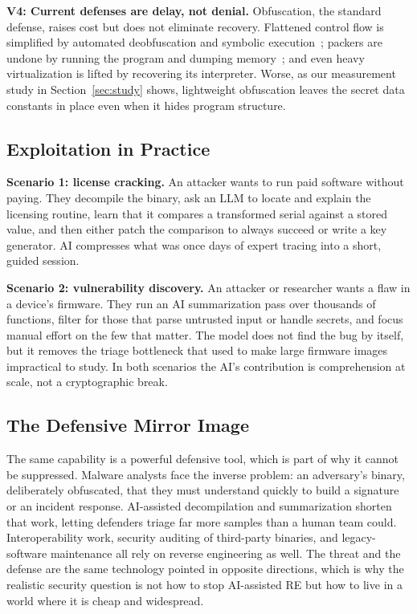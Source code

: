 \documentclass[conference]{IEEEtran}
\begin{document}
\textbf{V4: Current defenses are delay, not denial.} Obfuscation, the standard
defense, raises cost but does not eliminate recovery. Flattened control flow is
simplified by automated deobfuscation and symbolic execution~\cite{angr,udupa};
packers are undone by running the program and dumping memory~\cite{rolles}; and even
heavy virtualization is lifted by recovering its interpreter. Worse, as our
measurement study in Section~\ref{sec:study} shows, lightweight obfuscation leaves
the secret data constants in place even when it hides program structure.

\subsection{Exploitation in Practice}
\textbf{Scenario 1: license cracking.} An attacker wants to run paid software
without paying. They decompile the binary, ask an LLM to locate and explain the
licensing routine, learn that it compares a transformed serial against a stored
value, and then either patch the comparison to always succeed or write a key
generator. AI compresses what was once days of expert tracing into a short,
guided session.

\textbf{Scenario 2: vulnerability discovery.} An attacker or researcher wants a flaw
in a device's firmware. They run an AI summarization pass over thousands of
functions, filter for those that parse untrusted input or handle secrets, and focus
manual effort on the few that matter. The model does not find the bug by itself, but
it removes the triage bottleneck that used to make large firmware images
impractical to study. In both scenarios the AI's contribution is comprehension at
scale, not a cryptographic break.

\subsection{The Defensive Mirror Image}
The same capability is a powerful defensive tool, which is part of why it cannot be
suppressed. Malware analysts face the inverse problem: an adversary's binary,
deliberately obfuscated, that they must understand quickly to build a signature or
an incident response. AI-assisted decompilation and summarization shorten that work,
letting defenders triage far more samples than a human team could. Interoperability
work, security auditing of third-party binaries, and legacy-software maintenance all
rely on reverse engineering as well. The threat and the defense are the same
technology pointed in opposite directions, which is why the realistic security
question is not how to stop AI-assisted RE but how to live in a world where it is
cheap and widespread.
\end{document}
